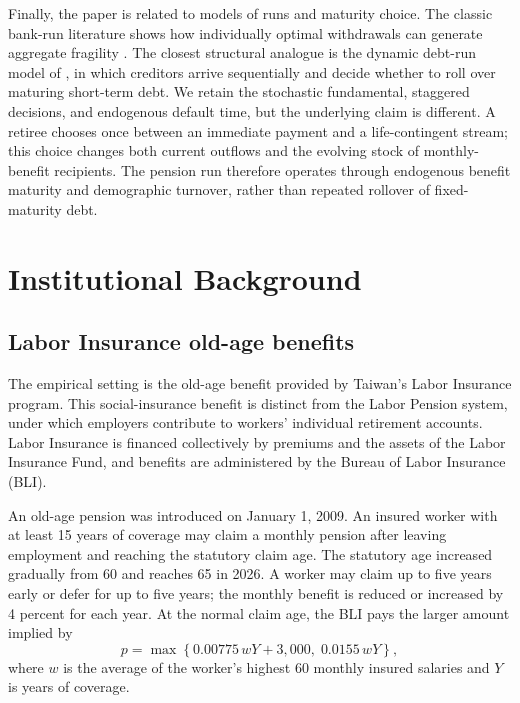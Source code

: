 \documentclass[a4paper, 12pt]{article}
\begin{document}
Finally, the paper is related to models of runs and maturity choice. The classic
bank-run literature shows how individually optimal withdrawals can generate
aggregate fragility \citep{diamond1983,goldstein2005}. The closest structural
analogue is the dynamic debt-run model of \citet{he2012}, in which creditors arrive
sequentially and decide whether to roll over maturing short-term debt. We retain
the stochastic fundamental, staggered decisions, and endogenous default time,
but the underlying claim is different. A retiree chooses once between an
immediate payment and a life-contingent stream; this choice changes both current
outflows and the evolving stock of monthly-benefit recipients. The pension run
therefore operates through endogenous benefit maturity and demographic turnover,
rather than repeated rollover of fixed-maturity debt.

\section{Institutional Background}
\subsection{Labor Insurance old-age benefits}
The empirical setting is the old-age benefit provided by Taiwan's Labor
Insurance program. This social-insurance benefit is distinct from the Labor
Pension system, under which employers contribute to workers' individual
retirement accounts. Labor Insurance is financed collectively by premiums and
the assets of the Labor Insurance Fund, and benefits are administered by the
Bureau of Labor Insurance (BLI).

An old-age pension was introduced on January 1, 2009. An insured worker with at
least 15 years of coverage may claim a monthly pension after leaving employment
and reaching the statutory claim age. The statutory age increased gradually
from 60 and reaches 65 in 2026. A worker may claim up to five years early or
defer for up to five years; the monthly benefit is reduced or increased by 4
percent for each year. At the normal claim age, the BLI pays the larger amount
implied by
\begin{equation}\label{eq:taiwan_annuity}
    p = \max\left\{0.00775\,wY+3{,}000,\;
                    0.0155\,wY\right\},
\end{equation}
where $w$ is the average of the worker's highest 60 monthly insured salaries and
$Y$ is years of coverage.
\end{document}
